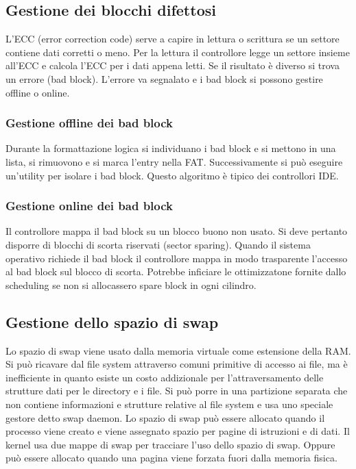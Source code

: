 \subsection{Gestione dei blocchi difettosi}
L'ECC (error correction code) serve a capire in lettura o scrittura se un settore contiene dati corretti o meno. Per la lettura il controllore legge un settore insieme all'ECC e calcola
l'ECC per i dati appena letti. Se il risultato \`e diverso si trova un errore (bad block). L'errore va segnalato e i bad block si possono gestire offline o online. 
\subsubsection{Gestione offline dei bad block}
Durante la formattazione logica si individuano i bad block e si mettono in una lista, si rimuovono e si marca l'entry nella FAT. Successivamente si pu\`o eseguire un'utility per isolare i 
bad block. Questo algoritmo \`e tipico dei controllori IDE. 
\subsubsection{Gestione online dei bad block}
Il controllore mappa il bad block su un blocco buono non usato. Si deve pertanto disporre di blocchi di scorta riservati (sector sparing). Quando il sistema operativo richiede il bad 
block il controllore mappa in modo trasparente l'accesso al bad block sul blocco di scorta. Potrebbe inficiare le ottimizzatone fornite dallo scheduling se non si allocassero spare
block in ogni cilindro. 
\subsection{Gestione dello spazio di swap}
Lo spazio di swap viene usato dalla memoria virtuale come estensione della RAM. Si pu\`o ricavare dal file system attraverso comuni primitive di accesso ai file, ma \`e inefficiente in
quanto esiste un costo addizionale per l'attraversamento delle strutture dati per le directory e i file. Si pu\`o porre in una partizione separata che non contiene informazioni e 
strutture relative al file system e usa uno speciale gestore detto swap daemon. Lo spazio di swap pu\`o essere allocato quando il processo viene creato e viene assegnato spazio per 
pagine di istruzioni e di dati. Il kernel usa due mappe di swap per tracciare l'uso dello spazio di swap. Oppure pu\`o essere allocato quando una pagina viene forzata fuori dalla memoria
fisica. 
